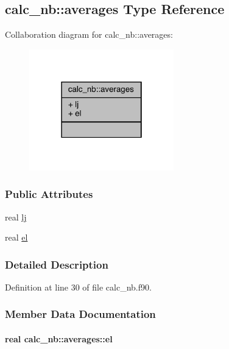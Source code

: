 \hypertarget{structcalc__nb_1_1averages}{\subsection{calc\-\_\-nb\-:\-:averages Type Reference}
\label{structcalc__nb_1_1averages}
}


Collaboration diagram for calc\-\_\-nb\-:\-:averages\-:
\nopagebreak
\begin{figure}[H]
\begin{center}
\leavevmode
\includegraphics[width=178pt]{structcalc__nb_1_1averages__coll__graph}
\end{center}
\end{figure}
\subsubsection*{Public Attributes}
\begin{DoxyCompactItemize}
\item 
real \hyperlink{structcalc__nb_1_1averages_ade656584c252dcd757623097f315b360}{lj}
\item 
real \hyperlink{structcalc__nb_1_1averages_a79e9e6020da6b10d35868f6aa05206b6}{el}
\end{DoxyCompactItemize}


\subsubsection{Detailed Description}


Definition at line 30 of file calc\-\_\-nb.\-f90.



\subsubsection{Member Data Documentation}
\hypertarget{structcalc__nb_1_1averages_a79e9e6020da6b10d35868f6aa05206b6}{
\paragraph[{el}]{\setlength{\rightskip}{0pt plus 5cm}real calc\-\_\-nb\-::averages\-::el}}\label{structcalc__nb_1_1averages_a79e9e6020da6b10d35868f6aa05206b6}


